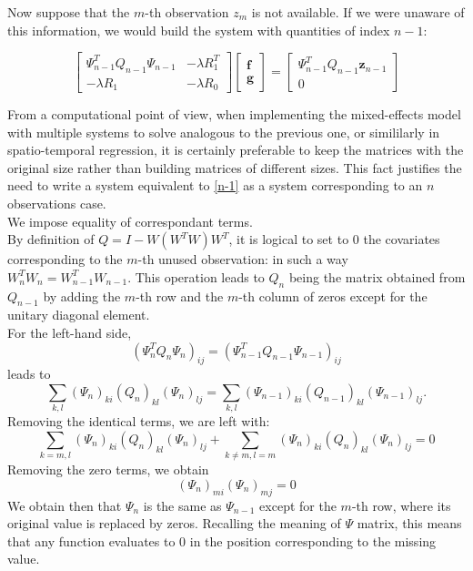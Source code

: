 Now suppose that the $m$-th observation $z_m$ is not available. If we were
unaware of this information, we would build the system with quantities of index
$n-1$:

\begin{equation}
	\label{n-1}
	\begin{bmatrix}
		\Psi_{n-1}^TQ_{n-1}\Psi_{n-1} & -\lambda R_1^T \\
		-\lambda R_1                  & -\lambda R_0
	\end{bmatrix}
	\begin{bmatrix}
		\bm{f} \\
		\bm{g}
	\end{bmatrix}
	=
	\begin{bmatrix}{\Psi}_{n-1}^T Q_{n-1}\bm{z}_{n-1} \\
		0
	\end{bmatrix}
\end{equation}

From a computational point of view, when implementing the mixed-effects model
with multiple systems to solve analogous to the previous one, or simililarly in
spatio-temporal regression, it is certainly preferable to keep the matrices
with the original size rather than building matrices of different sizes. This
fact justifies the need to write a system equivalent to \ref{n-1} as a system
corresponding to an $n$ observations case.\\ We impose equality of
correspondant terms.\\ By definition of $Q=I-W \left( W^T W \right) W^T$, it is
logical to set to $0$ the covariates corresponding to the $m$-th unused
observation: in such a way $W^T_nW_n=W^T_{n-1}W_{n-1}$. This operation leads to
$Q_n$ being the matrix obtained from $Q_{n-1}$ by adding the $m$-th row and the
$m$-th column of zeros except for the unitary diagonal element.\\ For the
left-hand side,
\begin{equation}
	\left(\Psi^T_nQ_n\Psi_n\right)_{ij}=\left(\Psi_{n-1}^TQ_{n-1}\Psi_{n-1}\right)_{ij}
\end{equation}
leads to
\begin{equation}
	\sum_{k,l}\left(\Psi_n\right)_{ki}\left( Q_n \right)_{kl} \left( \Psi_n\right)_{lj}=
	\sum_{k,l}\left(\Psi_{n-1}\right)_{ki}\left( Q_{n-1} \right)_{kl} \left( \Psi_{n-1}\right)_{lj}.
\end{equation}
Removing the identical terms, we are left with:
\begin{equation}
	\sum_{k=m,l}\left(\Psi_n\right)_{ki}\left( Q_n \right)_{kl} \left( \Psi_n\right)_{lj}
	+
	\sum_{k \neq m,l=m}\left(\Psi_n\right)_{ki}\left( Q_n \right)_{kl} \left( \Psi_n\right)_{lj}
	=0
\end{equation}
Removing the zero terms, we obtain
\begin{equation}
	\left(\Psi_n\right)_{mi}\left( \Psi_n\right)_{mj}=0
\end{equation}
We obtain then that $\Psi_n$ is the same as $\Psi_{n-1}$ except for
the $m$-th row, where its original value is replaced by zeros. Recalling the
meaning of $\Psi$ matrix, this means that any function evaluates to $0$ in the
position corresponding to the missing value.

